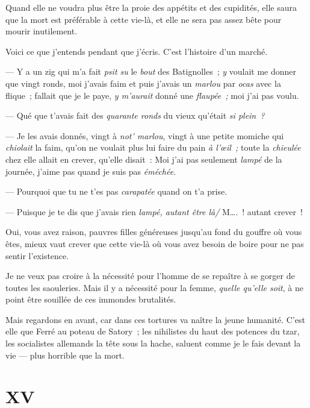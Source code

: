 \documentclass[french,twoside]{book} %
\newcommand\chapteropen{} %
\newcommand\chapterclose{} %
\begin{document}
Quand elle ne voudra plus être la proie des appétits et des cupidités, elle saura que la mort est préférable à cette vie-là, et elle ne sera pas assez bête pour mourir inutilement.\par
Voici ce que j’entends pendant que j’écris. C’est l’histoire d’un marché.\par
— Y a un zig qui m’a fait \emph{psit su} le \emph{bout} des Batignolles ; \emph{y} voulait me donner que vingt ronds, moi j’avais faim et puis j’avais un \emph{marlou} par \emph{ocas} avec la flique ; fallait que je le paye, \emph{y m’aurait} donné une \emph{flaupée ;} moi j’ai pas voulu.\par
— Qué que t’avais fait des \emph{quarante ronds} du vieux qu’était \emph{si plein ?}\par
— Je les avais donnés, vingt à \emph{not’ marlou}, vingt à une petite momiche qui \emph{chiolait} la faim, qu’on ne voulait plus lui faire du pain \emph{à l’œil ;} toute la \emph{chieulée} chez elle allait en crever, qu’elle disait : Moi j’ai pas seulement \emph{lampé} de la journée, j’aime pas quand je suis pas \emph{éméchée}.\par
— Pourquoi que tu ne t’es pas \emph{carapatée} quand on t’a prise.\par
— Puisque je te dis que j’avais rien \emph{lampé, autant être là/} M…. ! autant crever !\par
 Oui, vous avez raison, pauvres filles généreuses jusqu’au fond du gouffre où vous êtes, mieux vaut crever que cette vie-là où vous avez besoin de boire pour ne pas sentir l’existence.\par
Je ne veux pas croire à la nécessité pour l’homme de se repaître à se gorger de toutes les saouleries. Mais il y a nécessité pour la femme, \emph{quelle qu’elle soit}, à ne point être souillée de ces immondes brutalités.\par
Mais regardons en avant, car dans ces tortures va naître la jeune humanité. C’est elle que Ferré au poteau de Satory ; les nihilistes du haut des potences du tzar, les socialistes allemands la tête sous la hache, saluent comme je le fais devant la vie — plus horrible que la mort.
\chapterclose


\chapteropen
 \chapter[{XV}]{XV}
\label{p2.15}
\end{document}
